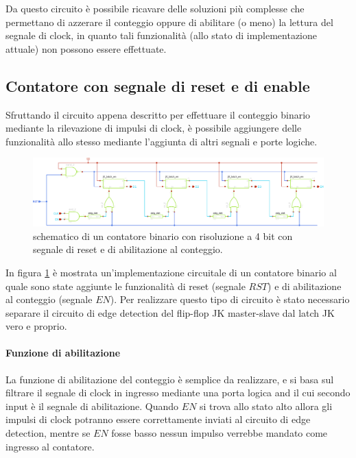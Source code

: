 	Da questo circuito è possibile ricavare delle soluzioni più complesse che permettano di azzerare il conteggio oppure di abilitare (o meno) la lettura del segnale di clock, in quanto tali funzionalità (allo stato di implementazione attuale) non possono essere effettuate.
	
\subsection*{Contatore con segnale di reset e di enable}
	
	Sfruttando il circuito appena descritto per effettuare il conteggio binario mediante la rilevazione di impulsi di clock, è possibile aggiungere delle funzionalità allo stesso mediante l'aggiunta di altri segnali e porte logiche. 
	
	\begin{figure}[bht]
		\centering
		\includegraphics[width=\linewidth]{Immagini/count2-sch}
		\caption{schematico di un contatore binario con risoluzione a 4 bit con segnale di reset e di abilitazione al conteggio.}
		\label{fig:count:resen}
	\end{figure}
	
	In figura \ref{fig:count:resen} è mostrata un'implementazione circuitale di un contatore binario al quale sono state aggiunte le funzionalità di reset (segnale $RST$) e di abilitazione al conteggio (segnale $EN$). Per realizzare questo tipo di circuito è stato necessario separare il circuito di edge detection del flip-flop JK master-slave dal latch JK vero e proprio. 
	
	\paragraph{Funzione di abilitazione} La funzione di abilitazione del conteggio è semplice da realizzare, e si basa sul filtrare il segnale di clock in ingresso mediante una porta logica and il cui secondo input è il segnale di abilitazione. Quando $EN$ si trova allo stato alto allora gli impulsi di clock potranno essere correttamente inviati al circuito di edge detection, mentre se $EN$ fosse basso nessun impulso verrebbe mandato come ingresso al contatore.
	
